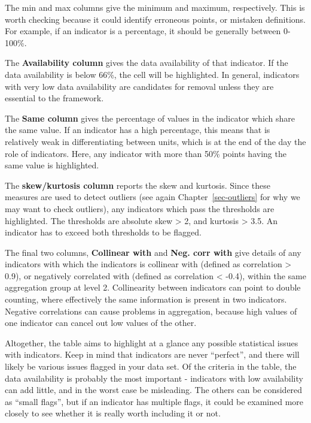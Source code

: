 \documentclass[
  letterpaper,
  DIV=11,
  numbers=noendperiod]{scrreprt}
\begin{document}
The min and max columns give the minimum and maximum, respectively. This
is worth checking because it could identify erroneous points, or
mistaken definitions. For example, if an indicator is a percentage, it
should be generally between 0-100\%.

The \textbf{Availability column} gives the data availability of that
indicator. If the data availability is below 66\%, the cell will be
highlighted. In general, indicators with very low data availability are
candidates for removal unless they are essential to the framework.

The \textbf{Same column} gives the percentage of values in the indicator
which share the same value. If an indicator has a high percentage, this
means that is relatively weak in differentiating between units, which is
at the end of the day the role of indicators. Here, any indicator with
more than 50\% points having the same value is highlighted.

The \textbf{skew/kurtosis column} reports the skew and kurtosis. Since
these measures are used to detect outliers (see again
Chapter~\ref{sec-outliers} for why we may want to check outliers), any
indicators which pass the thresholds are highlighted. The thresholds are
absolute skew \textgreater{} 2, and kurtosis \textgreater{} 3.5. An
indicator has to exceed both thresholds to be flagged.

The final two columns, \textbf{Collinear with} and \textbf{Neg. corr
with} give details of any indicators with which the indicators is
collinear with (defined as correlation \textgreater{} 0.9), or
negatively correlated with (defined as correlation \textless{} -0.4),
within the same aggregation group at level 2. Collinearity between
indicators can point to double counting, where effectively the same
information is present in two indicators. Negative correlations can
cause problems in aggregation, because high values of one indicator can
cancel out low values of the other.

Altogether, the table aims to highlight at a glance any possible
statistical issues with indicators. Keep in mind that indicators are
never ``perfect'', and there will likely be various issues flagged in
your data set. Of the criteria in the table, the data availability is
probably the most important - indicators with low availability can add
little, and in the worst case be misleading. The others can be
considered as ``small flags'', but if an indicator has multiple flags,
it could be examined more closely to see whether it is really worth
including it or not.
\end{document}
